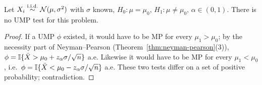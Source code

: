\documentclass[main.tex]{subfiles}
\begin{document}
\begin{proposition}\label{prop:iki-tarafli}
Let $X_i\overset{\text{i.i.d.}}{\sim}\mathcal{N}(\mu,\sigma^2)$ with $\sigma$ known, $H_0:\mu=\mu_0$, $H_1:\mu\neq\mu_0$, $\alpha\in(0,1)$. There is no UMP test for this problem.
\end{proposition}
\begin{proof}
If a UMP $\phi$ existed, it would have to be MP for every $\mu_1>\mu_0$; by the necessity part of Neyman--Pearson (Theorem~\ref{thm:neyman-pearson}(3)), $\phi=\mathbb{I}\{\bar X>\mu_0+z_\alpha\sigma/\sqrt n\}$ a.e. Likewise it would have to be MP for every $\mu_1<\mu_0$, i.e.\ $\phi=\mathbb{I}\{\bar X<\mu_0-z_\alpha\sigma/\sqrt n\}$ a.e. These two tests differ on a set of positive probability; contradiction.
\end{proof}
\end{document}
